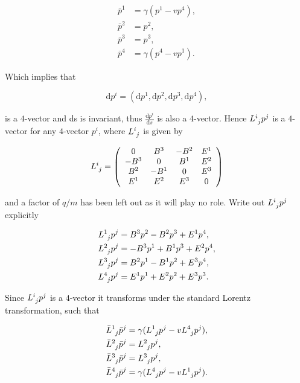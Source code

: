 \begin{appendix}
\begin{align*}
\bar{p}^1 & = \gamma (p^1 - v p^4),\\
\bar{p}^2 & = p^2, \\
\bar{p}^3 & = p^3,\\
\bar{p}^4 & = \gamma (p^4 - v p^1).
\end{align*}

\noindent Which implies that 

\begin{equation*}
\mathrm{d}p^i = (\mathrm{d}p^1,\mathrm{d}p^2,\mathrm{d}p^3,\mathrm{d}p^4),
\end{equation*}

\noindent is a $4$-vector and ds is invariant, thus $\frac{\mathrm{d}p^i}{\mathrm{d}s}$ is also a $4$-vector. Hence $\tensor{L}{^i_j} p^j$ is a $4$-vector for any $4$-vector $p^i$, where $\tensor{L}{^i_j}$ is given by

\begin{equation*}
\tensor{L}{^i_j} = 
\left(
\begin{array}{cccc}
0    & B^3  & -B^2 & E^1 \\
-B^3 & 0    & B^1  & E^2 \\
B^2  & -B^1 & 0    & E^3 \\
E^1  & E^2  & E^3  & 0   \\
\end{array}
\right)
\end{equation*}

\noindent and a factor of $q/m$ has been left out as it will play no role. Write out $\tensor{L}{^i_j} p^j$ explicitly

\begin{align*}
\tensor{L}{^1_j}p^j & = B^3 p^2 - B^2 p^3 + E^1 p^4, \\
\tensor{L}{^2_j}p^j & = -B^3 p^1 + B^1 p^3 + E^2 p^4, \\
\tensor{L}{^3_j}p^j & = B^2 p^1 - B^1 p^2 + E^3 p^4, \\
\tensor{L}{^4_j}p^j & = E^1 p^1 + E^2p^2 + E^3 p^3.
\end{align*}

\noindent Since $\tensor{L}{^i_j} p^j$ is a $4$-vector it transforms under the standard Lorentz transformation, such that

\begin{align}
\label{Appendix_Lp_Standard_Transform_a}
\tensor{\bar{L}}{^1_j}\bar{p}^j & = \gamma (\tensor{L}{^1_j}p^j - v \tensor{L}{^4_j}p^j),
\\\label{Appendix_Lp_Standard_Transform_b}
\tensor{\bar{L}}{^2_j}\bar{p}^j & = \tensor{L}{^2_j}p^j,
\\\label{Appendix_Lp_Standard_Transform_c}
\tensor{\bar{L}}{^3_j}\bar{p}^j & = \tensor{L}{^3_j}p^j,
\\\label{Appendix_Lp_Standard_Transform_d}
\tensor{\bar{L}}{^4_j}\bar{p}^j & = \gamma(\tensor{L}{^4_j}p^j - v \tensor{L}{^1_j}p^j).
\end{align}


\end{appendix}
